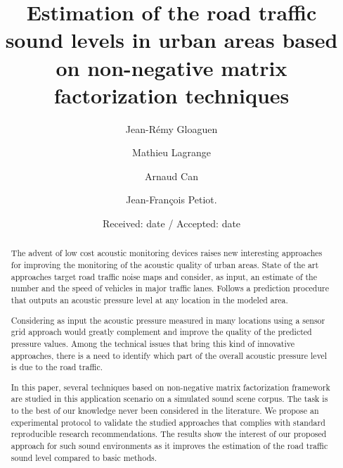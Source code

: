 \documentclass[twocolumn]{svjour3}          %
\begin{document}
\title{Estimation of the road traffic sound levels in urban areas based on non-negative matrix factorization techniques}

\author{Jean-R\'emy Gloaguen         \and
		Mathieu Lagrange \and
		Arnaud Can \and
		Jean-Fran\c cois Petiot.}


\date{Received: date / Accepted: date}


\maketitle

\begin{abstract}
The advent of low cost acoustic monitoring devices raises new interesting approaches for improving the monitoring of the acoustic quality of urban areas. State of the art approaches target road traffic noise maps and consider, as input, an estimate of the number and the speed of vehicles in major traffic lanes. Follows a prediction procedure that outputs an acoustic pressure level at any location in the modeled area.

Considering as input the acoustic pressure measured in many locations using a sensor grid approach would greatly complement and improve the quality of the predicted pressure values. Among the technical issues that bring this kind of innovative approaches, there is a need to identify which part of the overall acoustic pressure level is due to the road traffic.

In this paper, several techniques based on non-negative matrix  factorization framework are studied in this application scenario on a simulated sound scene corpus. The task is to the best of our knowledge never been considered in the literature. We propose an experimental protocol to validate the studied approaches that complies with standard reproducible research recommendations. The results show the interest of our proposed approach for such sound environments as it improves the estimation of the road traffic sound level compared to basic methods.

\end{abstract}
\end{document}
